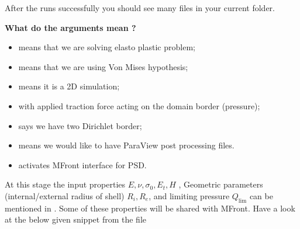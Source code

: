 After the  runs successfully you should see many
 files in your current folder.

\textbf{What do the arguments mean ?}

\begin{itemize}
\item {} means that we are solving elasto plastic problem;
\item {} means that we are using Von Mises hypothesis;
\item {} means it is a 2D simulation;
\item {} with applied traction force acting on the domain border (pressure);
\item {} says we have two Dirichlet border;
\item {} means we would like to have ParaView post processing files.
\item {} activates MFront interface for PSD.
\end{itemize}

At this stage the input properties \(E,\nu, \sigma_0, E_t, H\) ,
Geometric parameters (internal/external radius of shell) \(R_i, R_e\),
and limiting pressure \(Q_{\text{lim}}\) can be mentioned in
. Some of these properties will be shared
with MFront. Have a look at the below given snippet from the file

